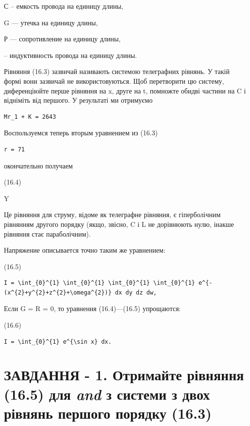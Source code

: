 \documentclass[
  ukrainian,
]{article}
\begin{document}
С -- емкость провода на единицу длины,

G --- утечка на единицу длины,

Р --- сопротивление на единицу длины,

-- индуктивность провода на единицу длины.

Рівняння (16.3) зазвичай називають системою телеграфних рівнянь. У такій
формі вони зазвичай не використовуються. Щоб перетворити цю систему,
диференціюйте перше рівняння на x, друге на t, помножте обидві частини
на C і відніміть від першого. У результаті ми отримуємо

\begin{verbatim}
Mr_1 + K = 2643
\end{verbatim}

Воспользуемся теперь вторым уравнением из (16.3)

\begin{verbatim}
r = 71
\end{verbatim}

окончательно получаем

(16.4)

Y

Це рівняння для струму, відоме як телеграфне рівняння, є гіперболічним
рівнянням другого порядку (якщо, звісно, C і L не дорівнюють нулю,
інакше рівняння стає параболічним).

Напряжение описывается точно таким же уравнением:

(16.5)

\begin{verbatim}
I = \int_{0}^{1} \int_{0}^{1} \int_{0}^{1} \int_{0}^{1} e^{-(x^{2}+y^{2}+z^{2}+\omega^{2})} dx dy dz dw,
\end{verbatim}

Если G = R = 0, то уравнения (16.4)---(16.5) упрощаются:

(16.6)

\begin{verbatim}
I = \int_{0}^{1} e^{\sin x} dx.
\end{verbatim}

\section{\texorpdfstring{ЗАВДАННЯ - 1. Отримайте рівняння (16.5) для
\emph{and} з системи з двох рівнянь першого порядку
(16.3)}{ЗАВДАННЯ - 1. Отримайте рівняння (16.5) для and з системи з двох рівнянь першого порядку (16.3)}}\label{ux437ux430ux432ux434ux430ux43dux43dux44f---1.-ux43eux442ux440ux438ux43cux430ux439ux442ux435-ux440ux456ux432ux43dux44fux43dux43dux44f-16.5-ux434ux43bux44f-and-ux437-ux441ux438ux441ux442ux435ux43cux438-ux437-ux434ux432ux43eux445-ux440ux456ux432ux43dux44fux43dux44c-ux43fux435ux440ux448ux43eux433ux43e-ux43fux43eux440ux44fux434ux43aux443-16.3}
\end{document}
